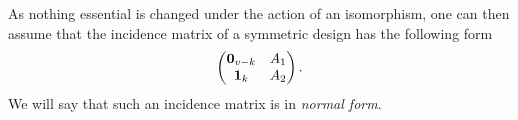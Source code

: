 \documentclass[../../../main]{subfiles}
\begin{document}
\begin{defin}
As nothing essential is changed under the action of an isomorphism, one can then assume that the incidence matrix of a symmetric design has the following form
\begin{equation}
    \begin{pmatrix}
     \mathbf{0}_{v-k} & A_1 \\
     \mathbf{1}_k & A_2
    \end{pmatrix}.
\end{equation}
We will say that such an incidence matrix is in {\it normal form}.
\end{defin}

\dinkus

\biblio
\end{document}
